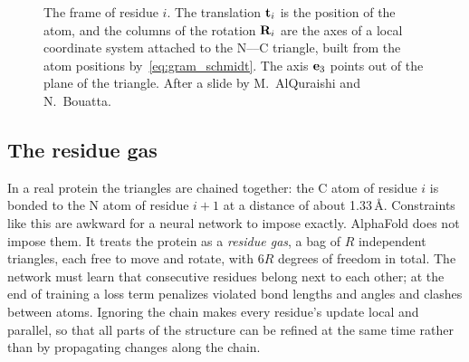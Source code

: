 \begin{figure}[!htbp]
  \centering
  \caption{The frame of residue $i$. The translation $\mathbf{t}_i$ is the position of the \Ca{} atom, and the columns of the rotation $\mathbf{R}_i$ are the axes of a local coordinate system attached to the N--\Ca--C triangle, built from the atom positions by~\eqref{eq:gram_schmidt}. The axis $\mathbf{e}_3$ points out of the plane of the triangle. After a slide by M.~AlQuraishi and N.~Bouatta.}
  \label{fig:frame}
\end{figure}

\subsection{The residue gas}

In a real protein the triangles are chained together: the C atom of residue $i$ is bonded to the N atom of residue $i+1$ at a distance of about 1.33\,\AA. Constraints like this are awkward for a neural network to impose exactly. AlphaFold does not impose them. It treats the protein as a \emph{residue gas}, a bag of $R$ independent triangles, each free to move and rotate, with $6R$ degrees of freedom in total. The network must learn that consecutive residues belong next to each other; at the end of training a loss term penalizes violated bond lengths and angles and clashes between atoms. Ignoring the chain makes every residue's update local and parallel, so that all parts of the structure can be refined at the same time rather than by propagating changes along the chain.

